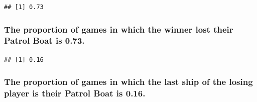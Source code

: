 \documentclass[
]{article}
\newenvironment{Shaded}{\begin{snugshade}}{\end{snugshade}}
\newcommand{\CommentTok}[1]{\textcolor[rgb]{0.56,0.35,0.01}{\textit{#1}}}
\newcommand{\ControlFlowTok}[1]{\textcolor[rgb]{0.13,0.29,0.53}{\textbf{#1}}}
\newcommand{\DecValTok}[1]{\textcolor[rgb]{0.00,0.00,0.81}{#1}}
\newcommand{\FunctionTok}[1]{\textcolor[rgb]{0.13,0.29,0.53}{\textbf{#1}}}
\newcommand{\NormalTok}[1]{#1}
\newcommand{\OtherTok}[1]{\textcolor[rgb]{0.56,0.35,0.01}{#1}}
\newcommand{\SpecialCharTok}[1]{\textcolor[rgb]{0.81,0.36,0.00}{\textbf{#1}}}
\begin{document}
\begin{verbatim}
## [1] 0.73
\end{verbatim}

\subsubsection{The proportion of games in which the winner lost their
Patrol Boat is
0.73.}\label{the-proportion-of-games-in-which-the-winner-lost-their-patrol-boat-is-0.73.}

\begin{Shaded}
\end{Shaded}

\begin{verbatim}
## [1] 0.16
\end{verbatim}

\subsubsection{The proportion of games in which the last ship of the
losing player is their Patrol Boat is
0.16.}\label{the-proportion-of-games-in-which-the-last-ship-of-the-losing-player-is-their-patrol-boat-is-0.16.}
\end{document}
